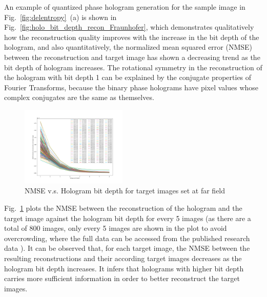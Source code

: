 	An example of quantized phase hologram generation for the sample image in Fig.~\ref{fig:delentropy}~(a) is shown in Fig.~\ref{fig:holo_bit_depth_recon_Fraunhofer}, which demonstrates qualitatively how the reconstruction quality improves with the increase in the bit depth of the hologram, and also quantitatively, the normalized mean squared error (NMSE) between the reconstruction and target image has shown a decreasing trend as the bit depth of hologram increases. The rotational symmetry in the reconstruction of the hologram with bit depth 1 can be explained by the conjugate properties of Fourier Transforms, because the binary phase holograms have pixel values whose complex conjugates are the same as themselves.


	\begin{figure} [ht]
	   \begin{center}
	   \includegraphics[trim={80 50 90 70}, clip, width = 0.45\textwidth]{GS_Fraunhofer_NMSE_VS_Hologram bit depth.png}
	   \end{center}
	   \caption{\label{fig:GS_Fraunhofer_NMSE_VS_Hologram_bit_depth} NMSE v.s. Hologram bit depth for target images set at far field}
	\end{figure}

	Fig.~\ref{fig:GS_Fraunhofer_NMSE_VS_Hologram_bit_depth} plots the NMSE between the reconstruction of the hologram and the target image against the hologram bit depth for every 5 images (as there are a total of 800 images, only every 5 images are shown in the plot to avoid overcrowding, where the full data can be accessed from the published research data \cite{research_data_Sha2024}). It can be observed that, for each target image, the NMSE between the resulting reconstructions and their according target images decreases as the hologram bit depth increases. It infers that holograms with higher bit depth carries more sufficient information in order to better reconstruct the target images.

